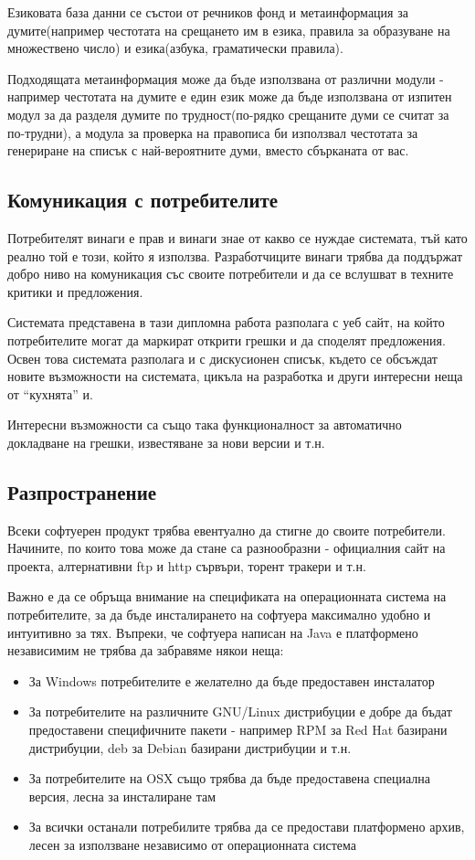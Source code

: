 Езиковата база данни се състои от речников фонд и метаинформация за
думите(например честотата на срещането им в езика, правила за
образуване на множествено число) и езика(азбука, граматически
правила).

Подходящата метаинформация може да бъде използвана от различни модули
- например честотата на думите е един език може да бъде използвана от
изпитен модул за да разделя думите по трудност(по-рядко срещаните думи
се считат за по-трудни), а модула за проверка на правописа би
използвал честотата за генериране на списък с най-вероятните думи,
вместо сбърканата от вас.
\subsection{Комуникация с потребителите}
Потребителят винаги е прав и винаги знае от какво се нуждае системата,
тъй като реално той е този, който я използва. Разработчиците винаги
трябва да поддържат добро ниво на комуникация със своите потребители и
да се вслушват в техните критики и предложения. 

Системата представена в тази дипломна работа разполага с уеб сайт, на
който потребителите могат да маркират открити грешки и да споделят
предложения. Освен това системата разполага и с дискусионен списък,
където се обсъждат новите възможности на системата, цикъла на
разработка и други интересни неща от "`кухнята"' и. 

Интересни възможности са също така функционалност за автоматично
докладване на грешки, известяване за нови версии и т.н.
\subsection{Разпространение}
Всеки софтуерен продукт трябва евентуално да стигне до своите
потребители. Начините, по които това може да стане са разнообразни -
официалния сайт на проекта, алтернативни ftp и http сървъри, торент
тракери и т.н. 

Важно е да се обръща внимание на спецификата на операционната система
на потребителите, за да бъде инсталирането на софтуера максимално
удобно и интуитивно за тях. Въпреки, че софтуера написан на Java е
платформено независимим не трябва да забравяме някои неща:
\begin{itemize}
  \item За Windows потребителите е желателно да бъде предоставен
  инсталатор
  \item За потребителите на различните GNU/Linux дистрибуции е добре
    да бъдат предоставени специфичните пакети - например RPM за Red
    Hat базирани дистрибуции, deb за Debian базирани дистрибуции и
    т.н.
  \item За потребителите на OSX също трябва да бъде предоставена
    специална версия, лесна за инсталиране там
  \item За всички останали потребилите трябва да се предостави
    платформено архив, лесен за използване независимо от операционната система 
\end{itemize}
